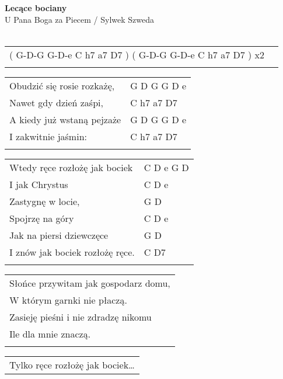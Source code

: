 \documentclass[a5paper]{article}
\begin{document}


\noindent
\fontsize{12pt}{15pt}\selectfont
\textbf{Lecące bociany} \\
\fontsize{8pt}{10pt}\selectfont
U Pana Boga za Piecem / Sylwek Szweda \\ \\
\fontsize{10pt}{12pt}\selectfont
{}
\begin{tabular}{@{}p{10.50cm}p{3cm}@{}}
\noindent
( G-D-G G-D-e C h7 a7 D7 ) ( G-D-G G-D-e C h7 a7 D7 ) x2 \\ \\
\end{tabular}  

\noindent
\begin{tabular}{@{}p{7.50cm}p{3cm}@{}}   
Obudzić się rosie rozkażę, & G D G G D e \\
Nawet gdy dzień zaśpi, & C h7 a7 D7 \\
A kiedy już wstaną pejzaże & G D G G D e \\
I zakwitnie jaśmin: & C h7 a7 D7 \\ \\
\end{tabular}

\noindent
\begin{tabular}{@{}p{6.50cm}p{3cm}@{}}
Wtedy ręce rozłożę jak bociek & C D e G D \\
I jak Chrystus & C D e \\
Zastygnę w locie, & G D \\
Spojrzę na góry & C D e \\
Jak na piersi dziewczęce & G D \\
I znów jak bociek rozłożę ręce. & C D7 \\ \\
\end{tabular}

\noindent
\begin{tabular}{@{}p{8.50cm}@{}}
Słońce przywitam jak gospodarz domu, \\
W którym garnki nie płaczą. \\
Zasieję pieśni i nie zdradzę nikomu \\
Ile dla mnie znaczą. \\ \\
\end{tabular}

\noindent
\begin{tabular}{@{}p{7.50cm}@{}}
Tylko ręce rozłożę jak bociek…
\end{tabular}
\end{document}
